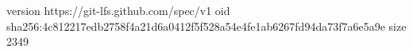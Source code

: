 version https://git-lfs.github.com/spec/v1
oid sha256:4c812217edb2758f4a21d6a0412f5f528a54e4fe1ab6267fd94da73f7a6e5a9e
size 2349
